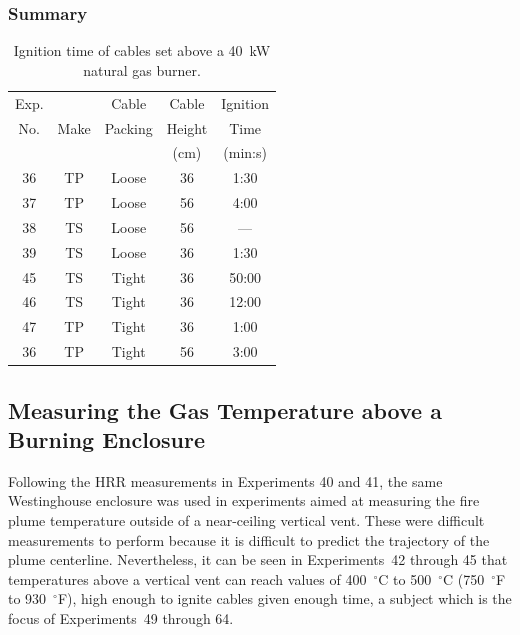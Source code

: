 \subsubsection{Summary}

\begin{table}[ht]
\begin{center}
\caption[Results of cable tray ignition experiments]{Ignition time of cables set above a 40~kW natural gas burner.}
\label{matrix}
\begin{tabular}{|c|c|c|c|c|}
\hline
Exp.   &          & Cable             & Cable         & Ignition         \\
No.    & Make     & Packing           & Height        & Time             \\
       &          &                   & (cm)          & (min:s)          \\ \hline
36     & TP       & Loose             & 36            & 1:30             \\ \hline
37     & TP       & Loose             & 56            & 4:00             \\ \hline
38     & TS       & Loose             & 56            & ---              \\ \hline
39     & TS       & Loose             & 36            & 1:30             \\ \hline
45     & TS       & Tight             & 36            & 50:00            \\ \hline
46     & TS       & Tight             & 36            & 12:00            \\ \hline
47     & TP       & Tight             & 36            & 1:00             \\ \hline
36     & TP       & Tight             & 56            & 3:00             \\ \hline

\end{tabular}
\end{center}
\end{table}



\clearpage

\subsection{Measuring the Gas Temperature above a Burning Enclosure}

Following the HRR measurements in Experiments 40 and 41, the same Westinghouse enclosure was used in experiments aimed at measuring the fire plume temperature outside of a near-ceiling vertical vent. These were difficult measurements to perform because it is difficult to predict the trajectory of the plume centerline. Nevertheless, it can be seen in Experiments~42 through 45 that temperatures above a vertical vent can reach values of 400~$^\circ$C to 500~$^\circ$C (750~$^\circ$F to 930~$^\circ$F), high enough to ignite cables given enough time, a subject which is the focus of Experiments~49 through 64.



